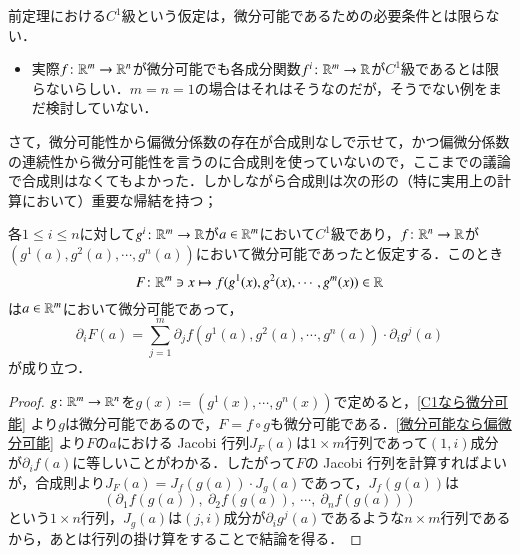 \begin{que}[*]
前定理における$C^1$級という仮定は，微分可能であるための必要条件とは限らない．
\begin{itemize}
\item 実際$f \colon \mathbb{R}^m \to \mathbb{R}^n$が微分可能でも各成分関数$f^i \colon \mathbb{R}^m \to \mathbb{R}$が$C^1$級であるとは限らないらしい．$m=n=1$の場合はそれはそうなのだが，そうでない例をまだ検討していない．
\end{itemize}
\end{que}

さて，微分可能性から偏微分係数の存在が合成則なしで示せて，かつ偏微分係数の連続性から微分可能性を言うのに合成則を使っていないので，ここまでの議論で合成則はなくてもよかった．しかしながら合成則は次の形の（特に実用上の計算において）重要な帰結を持つ；

\begin{prop}\label{実用的な方の合成則}
各$1 \leq i \leq n$に対して$g^i \colon \mathbb{R}^m \to \mathbb{R}$が$a \in \mathbb{R}^m$において$C^1$級であり，$f \colon \mathbb{R}^n \to \mathbb{R}$が$(g^1(a), g^2(a), \cdots, g^n(a))$において微分可能であったと仮定する．このとき
\begin{equation}
F \colon \mathbb{R}^m \ni x \mapsto f(g^1(x), g^2(x), \cdots, g^m(x)) \in \mathbb{R}
\end{equation}
は$a \in \mathbb{R}^m$において微分可能であって，
\begin{equation}
\partial_i F (a) = \sum_{j=1}^m \partial_j f(g^1(a), g^2(a), \cdots, g^n(a)) \cdot \partial_i g^j (a)
\end{equation}が成り立つ．
\end{prop}

\begin{proof}
$g \colon \mathbb{R}^m \to \mathbb{R}^n$を$g(x) \coloneqq (g^1(x), \cdots, g^n(x))$で定めると，\cref{C1なら微分可能} より$g$は微分可能であるので，$F = f \circ g$も微分可能である．\cref{微分可能なら偏微分可能} より$F$の$a$における Jacobi 行列$J_F(a)$は$1 \times m$行列であって$(1,i)$成分が$\partial_i f (a)$に等しいことがわかる．したがって$F$の Jacobi 行列を計算すればよいが，合成則より$J_F(a) = J_f (g(a)) \cdot J_g(a)$であって，$J_f(g(a))$は
\begin{equation}
\left( \partial_1 f(g(a)),\ \partial_2 f(g(a)),\ \cdots,\ \partial_n f(g(a))  \right)
\end{equation}という$1 \times n$行列，$J_g(a)$は$(j,i)$成分が$\partial_i g^j(a)$であるような$n \times m$行列であるから，あとは行列の掛け算をすることで結論を得る．
\end{proof}

